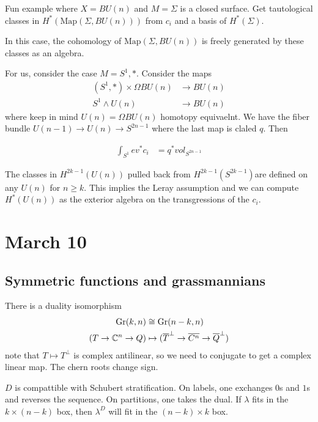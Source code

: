 \documentclass[12pt]{article}
\begin{document}
    Fun example where $X = BU(n)$ and $M = \Sigma$ is a closed surface. Get tautological classes in $H^*(\mathrm{Map}(\Sigma, BU(n)))$ from $c_i$ and a basis of $H^*(\Sigma)$. 

    \begin{theorem}
        In this case, the cohomology of $\mathrm{Map}(\Sigma, BU(n))$ is freely generated by these classes as an algebra.
    \end{theorem}
    For us, consider the case $M = S^1,*$. Consider the maps \begin{align*}
        (S^1, *) \times \Omega BU(n) &\to BU(n) \\
        S^1 \wedge U(n) &\to BU(n)
    \end{align*}
    where keep in mind $U(n) = \Omega BU(n)$ homotopy equivaelnt. We have the fiber bundle $U(n-1) \to U(n) \to S^{2n-1}$ where the last map is claled $q$. Then \begin{theorem}
        \begin{align*}
            \int_{S^1} ev^* c_i &= q^* vol_{S^{2n-1}}
        \end{align*}
    \end{theorem}
\begin{corollary}
    The classes in $H^{2k-1}(U(n))$ pulled back from $H^{2k-1}(S^{2k-1})$are defined on any $U(n)$ for $n\geq k$. This implies the Leray assumption and we can compute $H^*(U(n))$ as the exterior algebra on the transgressions of the $c_i$.
\end{corollary}

\section{March 10}
\subsection{Symmetric functions and grassmannians}
There is a duality isomorphism \begin{align*}
    \operatorname{Gr}(k,n) &\cong \operatorname{Gr}(n-k,n) \\
        (T \to \mathbb{C}^n \to Q) &\mapsto (\overline T^{\perp} \to \overline{C^n} \to \overline Q^{\perp})
\end{align*} note that $T \mapsto T^\perp$ is complex antilinear, so we need to conjugate to get a complex linear map. The chern roots change sign.

\begin{theorem}
    $D$ is compattible with Schubert stratification. On labels, one exchanges $0$s and $1$s and reverses the sequence. On partitions, one takes the dual. If $\lambda$ fits in the $k\times (n-k)$ box, then $\lambda^D$ will fit in the $(n-k)\times k$ box. 
\end{theorem}
\end{document}
